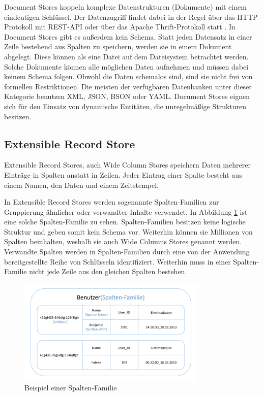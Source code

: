 Document Stores koppeln komplexe Datenstrukturen (Dokumente) mit einem eindeutigen Schlüssel. Der Datenzugriff findet dabei in der Regel über das HTTP-Protokoll mit REST-API oder über das Apache Thrift-Protokoll statt \cite{agarwal2007thrift}. In Document Stores gibt es außerdem kein Schema. Statt jeden Datensatz in einer Zeile bestehend aus Spalten zu speichern, werden sie in einem Dokument abgelegt. Diese können als eine Datei auf dem Dateisystem betrachtet werden. Solche Dokumente können alle möglichen Daten aufnehmen und müssen dabei keinem Schema folgen. Obwohl die Daten schemalos sind, sind sie nicht frei von formellen Restriktionen. Die meisten der verfügbaren Datenbanken unter dieser Kategorie benutzen XML, JSON, BSON oder YAML. Document Stores eignen sich für den Einsatz von dynamische Entitäten, die unregelmäßige Strukturen besitzen.

\subsection{Extensible Record Store}
\label{ch:grundlagen:sec:NoSQL:ExtensibleRecordStore}

Extensible Record Stores, auch Wide Column Stores speichern Daten mehrerer Einträge in Spalten anstatt in Zeilen. Jeder Eintrag einer Spalte besteht aus einem Namen, den Daten und einem Zeitstempel.

In Extensible Record Stores werden sogenannte Spalten-Familien zur Gruppierung ähnlicher oder verwandter Inhalte verwendet. In Abbildung \ref{wide_column_store} ist eine solche Spalten-Familie zu sehen. Spalten-Familien besitzen keine logische Struktur und geben somit kein Schema vor. Weiterhin können sie Millionen von Spalten beinhalten, weshalb sie auch Wide Columns Stores genannt werden. Verwandte Spalten werden in Spalten-Familien durch eine von der Anwendung bereitgestellte Reihe von Schlüsseln identifiziert. Weiterhin muss in einer Spalten-Familie nicht jede Zeile aus den gleichen Spalten bestehen.

\begin{figure}[htbp]
	\centering
  \includegraphics[width=0.8\textwidth, width=0.8\textwidth]{pics/wide_column_stores.pdf}
	\caption{Beispiel einer Spalten-Familie}
	\label{wide_column_store}
\end{figure}

